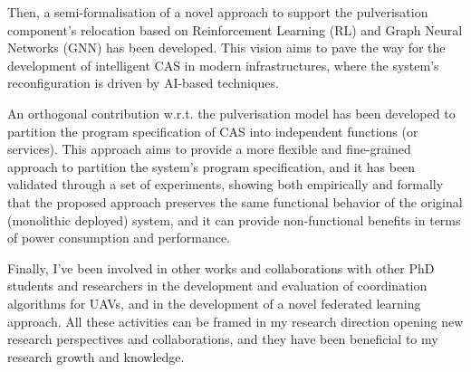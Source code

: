 \documentclass[runningheads]{llncs}
\begin{document}
Then,
a semi-formalisation of a novel approach to support the pulverisation component's relocation based on Reinforcement Learning (RL) and Graph Neural Networks (GNN) has been developed.
%
This vision aims to pave the way for the development of intelligent CAS in modern infrastructures,
where the system's reconfiguration is driven by AI-based techniques.

An orthogonal contribution w.r.t. the pulverisation model has been developed to partition the program specification of CAS into independent functions (or services).
%
This approach aims to provide a more flexible and fine-grained approach to partition the system's program specification,
and it has been validated through a set of experiments,
showing both empirically and formally that the proposed approach preserves the same functional behavior of the original (monolithic deployed) system,
and it can provide non-functional benefits in terms of power consumption and performance.

Finally,
I've been involved in other works and collaborations with other PhD students and researchers
in the development and evaluation of coordination algorithms for UAVs,
and in the development of a novel federated learning approach.
%
All these activities can be framed in my research direction opening new research perspectives and collaborations,
and they have been beneficial to my research growth and knowledge.



\end{document}
